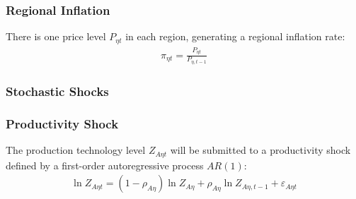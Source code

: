 \documentclass[
thesis.tex
]{subfiles}
\begin{document}
\begin{comment}
	\begin{align}
		P_{t} Y_{t} &= P_{1t} Y_{1t} + P_{2t} Y_{2t} \implies \nonumber \\
		P_{t} &= \frac{Y_{1t}}{Y_{t}} P_{1t} + \frac{Y_{2t}}{Y_{t}} P_{2t} \implies \nonumber \\
		P_{t} &= \theta_{P1} P_{1t} + (1 -\theta_{P1}) P_{2t} %
	\end{align}
	
	where $\theta_{P1}$ and $(1-\theta_{P1})$ are the price level weights of regions 1 and 2 in the national price level composition, respectively:
	\begin{align}
		\left\langle \begin{matrix} \theta_{P1} & (1-\theta_{P1}) \end{matrix} \right\rangle \coloneq \left\langle \begin{matrix} \frac{Y_{1t}}{Yt} & \frac{Y_{2t}}{Yt} \end{matrix} \right\rangle \label{eq:reg-ss-P1-P2-weight-in-P}
	\end{align}
\end{comment}

\subsubsection*{Regional Inflation}

There is one price level $P_{\eta t}$ in each region, generating a regional inflation rate:
\begin{align}
	\pi_{\eta t} = \frac{P_{\eta t}}{P_{\eta, t-1}} \label{eq:regional-inflation}
\end{align}


\subsubsection{Stochastic Shocks}\label{sec:reg-stochastic-shocks}

\subsubsection*{Productivity Shock} \label{sec:reg-productivity-shock}

The production technology level $Z_{A\eta t}$ will be submitted to a productivity shock defined by a first-order autoregressive process $AR(1)$:
\begin{align}
	\ln{Z_{A\eta t}} = (1-\rho_{A\eta})\ln{Z_{A\eta}} + \rho_{A\eta}\ln{Z_{A\eta,t-1}} + \varepsilon_{A\eta t} \label{eq:reg-productivity-shock}
\end{align}
\end{document}
